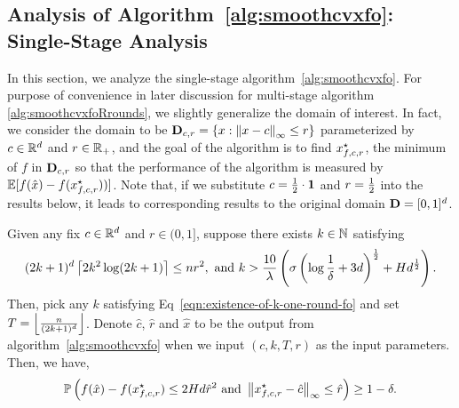 \subsection{Analysis of Algorithm~\ref{alg:smoothcvxfo}: Single-Stage Analysis}
In this section, we analyze the single-stage algorithm~\ref{alg:smoothcvxfo}. 
For purpose of convenience in later discussion for multi-stage algorithm
\ref{alg:smoothcvxfoRrounds}, we slightly generalize the domain of interest. 
In fact, we consider the domain to be $\mathbf{D}_{c, r} = \{x: \left\|{x-c}\right\|_\infty \leq r\}$ 
parameterized by $c \in \mathbb{R}^d$ and $r\in \mathbb{R}_+$, and the goal of the algorithm 
is to find $x_{f, c, r}^\star$, the minimum of $f$ in $\mathbf{D}_{c, r}$ so that the 
performance of the algorithm is measured by $\mathbb{E}[f(\hat{x}) - f(x_{f, c, r}^\star))]$.
Note that, if we substitute $c= \frac{1}{2} \cdot \mathbf{1}$ and $r = \frac{1}{2}$ into the results 
below, it leads to corresponding results to the original domain $\mathbf{D} = [0, 1]^d$.
\begin{proposition}
\label{proposition:first-order-smooth-one-round}
Given any fix $c\in \mathbb{R}^d$ and $r \in (0, 1]$, suppose there exists $k \in \mathbb{N}$ 
satisfying 
\begin{align}
\label{eqn:existence-of-k-one-round-fo}
(2k + 1)^d \left\lceil{2k^2 \log (2k+1)}\right\rceil \leq nr^2, ~
\text{and}~
k > \frac{10}{\lambda} \left(\sigma \left(\log \frac{1}{\delta} + 3d\right)^{\frac{1}{2}}+Hd^{\frac{1}{2}}\right).
\end{align}
Then, pick any $k$ satisfying Eq~\eqref{eqn:existence-of-k-one-round-fo} and 
set $T= \left\lfloor{\frac{n}{(2k+1)^d}}\right\rfloor$. Denote $\hat{c}$, $\hat{r}$ and 
$\hat{x}$ to be the output from algorithm~\ref{alg:smoothcvxfo} when we input
$(c, k, T, r)$ as the input parameters. Then, we have, 
\begin{equation*}
\mathbb{P}\left(f(\hat{x}) - f(x_{f, c, r}^\star) \leq 2Hd\hat{r}^2 ~\text{and}~ 
	\left\|{x_{f, c, r}^\star - \hat{c}}\right\|_\infty \leq \hat{r} \right)\geq 1-\delta.
\end{equation*}
\end{proposition}
